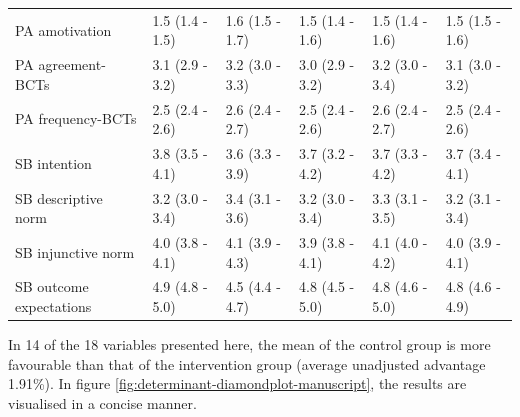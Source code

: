 \documentclass[british,man]{apa6}
\newenvironment{lltable}{\begin{landscape}\begin{center}\begin{ThreePartTable}}{\end{ThreePartTable}\end{center}\end{landscape}}
\begin{document}
\begin{lltable}
\begin{longtable}{llllll}
PA amotivation & 1.5 (1.4 - 1.5) & 1.6 (1.5 - 1.7) & 1.5 (1.4 - 1.6) & 1.5 (1.4 - 1.6) & 1.5 (1.5 - 1.6)\\
PA agreement-BCTs & 3.1 (2.9 - 3.2) & 3.2 (3.0 - 3.3) & 3.0 (2.9 - 3.2) & 3.2 (3.0 - 3.4) & 3.1 (3.0 - 3.2)\\
PA frequency-BCTs & 2.5 (2.4 - 2.6) & 2.6 (2.4 - 2.7) & 2.5 (2.4 - 2.6) & 2.6 (2.4 - 2.7) & 2.5 (2.4 - 2.6)\\
SB intention & 3.8 (3.5 - 4.1) & 3.6 (3.3 - 3.9) & 3.7 (3.2 - 4.2) & 3.7 (3.3 - 4.2) & 3.7 (3.4 - 4.1)\\
SB descriptive norm & 3.2 (3.0 - 3.4) & 3.4 (3.1 - 3.6) & 3.2 (3.0 - 3.4) & 3.3 (3.1 - 3.5) & 3.2 (3.1 - 3.4)\\
SB injunctive norm & 4.0 (3.8 - 4.1) & 4.1 (3.9 - 4.3) & 3.9 (3.8 - 4.1) & 4.1 (4.0 - 4.2) & 4.0 (3.9 - 4.1)\\
SB outcome expectations & 4.9 (4.8 - 5.0) & 4.5 (4.4 - 4.7) & 4.8 (4.5 - 5.0) & 4.8 (4.6 - 5.0) & 4.8 (4.6 - 4.9)\\
\bottomrule
\end{longtable}
\end{lltable}

In 14 of the 18 variables presented here, the mean of the control group is more favourable than that of the intervention group (average unadjusted advantage 1.91\%). In figure \ref{fig:determinant-diamondplot-manuscript}, the results are visualised in a concise manner.
\end{document}

